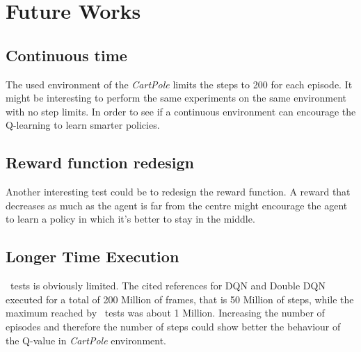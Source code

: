 
\section{Future Works}

\subsection{Continuous time}

The used environment of the \textit{CartPole} limits the steps to 200 for each episode. It might be interesting to perform the same experiments on the same environment with no step limits. In order to see if a continuous environment can encourage the Q-learning to learn smarter policies.

\subsection{Reward function redesign}

Another interesting test could be to redesign the reward function. A reward that decreases as much as the agent is far from the centre might encourage the agent to learn a policy in which it's better to stay in the middle.

\subsection{Longer Time Execution}

\Authpp~tests is obviously limited. The cited references for DQN and Double DQN executed for a total of 200 Million of frames, that is 50 Million of steps, while the maximum reached by \authpp~tests was about 1 Million. Increasing the number of episodes and therefore the number of steps could show better the behaviour of the Q-value in \textit{CartPole} environment.